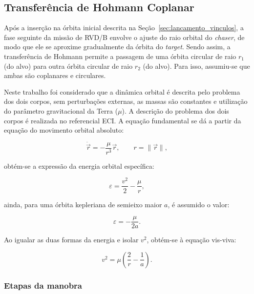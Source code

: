 \subsection{Transferência de Hohmann Coplanar}
\label{sec:transf_hohmann}

Após a inserção na órbita inicial descrita na Seção~\ref{sec:lancamento_vinculos}, a fase seguinte da missão de RVD/B envolve o ajuste do raio orbital do \emph{chaser}, de modo que ele se aproxime gradualmente da órbita do \emph{target}.
Sendo assim, a transferência de Hohmann permite a passagem de uma órbita circular de raio $r_1$ (do alvo) para outra órbita circular de raio $r_2$ (do alvo). Para isso, assumiu-se que ambas são coplanares e circulares.

Neste trabalho foi considerado que a dinâmica orbital é descrita pelo problema dos dois corpos, sem perturbações externas, as massas são constantes e utilização do parâmetro gravitacional da Terra ($\mu$).
A descrição do problema dos dois corpos é realizada no referencial ECI. A equação fundamental se dá a partir da equação do movimento orbital absoluto:

\begin{equation}
\ddot{\vec r} = -\frac{\mu}{r^3}\vec r,
\qquad r = \|\vec r\|,
\end{equation}

obtém-se a expressão da energia orbital específica:

\begin{equation}
\varepsilon = \frac{v^2}{2} - \frac{\mu}{r},
\end{equation}

ainda, para uma órbita kepleriana de semieixo maior $a$, é assumido o valor:

\begin{equation}
\varepsilon = -\frac{\mu}{2a}.
\end{equation}

Ao igualar as duas formas da energia e isolar $v^2$, obtém-se à equação vis-viva:

\begin{equation}
v^2 = \mu \left(\frac{2}{r} - \frac{1}{a}\right).
\end{equation}

\subsubsection{Etapas da manobra}


